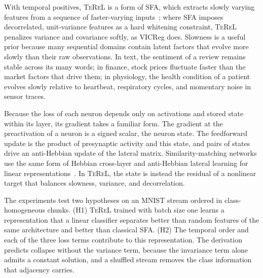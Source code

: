 \documentclass[11pt]{article}
\newcommand{\TeReL}{\textsc{TeReL}}
\begin{document}
With temporal positives, \TeReL{} is a form of SFA, which extracts slowly
varying features from a sequence of faster-varying
inputs~\cite{wiskott2002,foldiak1991}; where SFA imposes decorrelated,
unit-variance features as a hard whitening constraint, \TeReL{} penalizes
variance and covariance softly, as VICReg does. Slowness is a useful prior
because many sequential domains contain latent factors that evolve more slowly
than their raw observations. In text, the sentiment of a review remains stable
across its many words; in finance, stock prices fluctuate faster than the
market factors that drive them; in physiology, the health condition of a
patient evolves slowly relative to heartbeat, respiratory cycles, and momentary
noise in sensor traces.

Because the loss of each neuron depends only on activations and stored state
within its layer, its gradient takes a familiar form. The gradient at the preactivation of
a neuron is a signed scalar, the neuron state. The feedforward update is the
product of presynaptic activity and this state, and pairs of states drive an
anti-Hebbian update of the lateral matrix. Similarity-matching networks use the
same form of Hebbian cross-layer and anti-Hebbian lateral learning for linear
representations~\cite{pehlevan2015,pehlevan2018}. In \TeReL{}, the state is
instead the residual of a nonlinear target that balances slowness, variance,
and decorrelation.

The experiments test two hypotheses on an MNIST stream ordered in
class-homogeneous chunks. (H1) \TeReL{} trained with batch size one learns a
representation that a linear classifier separates better than random features
of the same architecture and better than classical SFA. (H2) The temporal order
and each of the three loss terms contribute to this representation. The
derivation predicts collapse without the variance term, because the
invariance term alone admits a constant solution, and a shuffled stream
removes the class information that adjacency carries.
\end{document}

